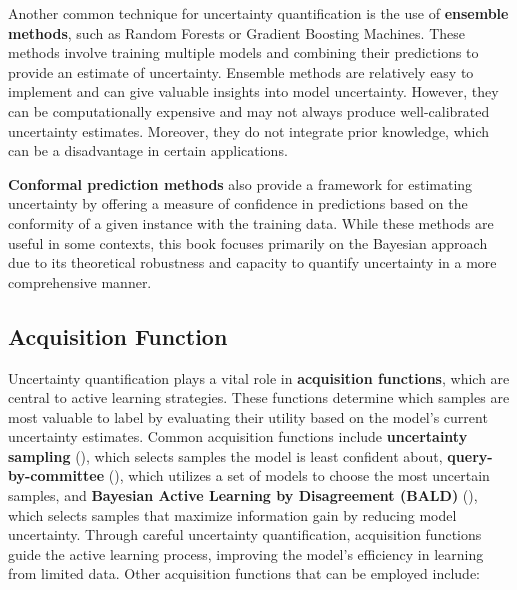 \documentclass[
  letterpaper,
  numbers=noenddot,
  DIV=11]{scrreprt}
\theoremstyle{definition}
\theoremstyle{plain}
\theoremstyle{plain}
\theoremstyle{remark}
\begin{document}
Another common technique for uncertainty quantification is the use of
\textbf{ensemble methods}, such as Random Forests or Gradient Boosting
Machines. These methods involve training multiple models and combining
their predictions to provide an estimate of uncertainty. Ensemble
methods are relatively easy to implement and can give valuable insights
into model uncertainty. However, they can be computationally expensive
and may not always produce well-calibrated uncertainty estimates.
Moreover, they do not integrate prior knowledge, which can be a
disadvantage in certain applications.

\textbf{Conformal prediction methods} also provide a framework for
estimating uncertainty by offering a measure of confidence in
predictions based on the conformity of a given instance with the
training data. While these methods are useful in some contexts, this
book focuses primarily on the Bayesian approach due to its theoretical
robustness and capacity to quantify uncertainty in a more comprehensive
manner.

\subsection{Acquisition Function}\label{acquisition-function}

Uncertainty quantification plays a vital role in \textbf{acquisition
functions}, which are central to active learning strategies. These
functions determine which samples are most valuable to label by
evaluating their utility based on the model's current uncertainty
estimates. Common acquisition functions include \textbf{uncertainty
sampling} (), which
selects samples the model is least confident about,
\textbf{query-by-committee} (), which utilizes a set of models to choose the most uncertain
samples, and \textbf{Bayesian Active Learning by Disagreement (BALD)}
(), which selects samples
that maximize information gain by reducing model uncertainty. Through
careful uncertainty quantification, acquisition functions guide the
active learning process, improving the model's efficiency in learning
from limited data. Other acquisition functions that can be employed
include:
\end{document}
